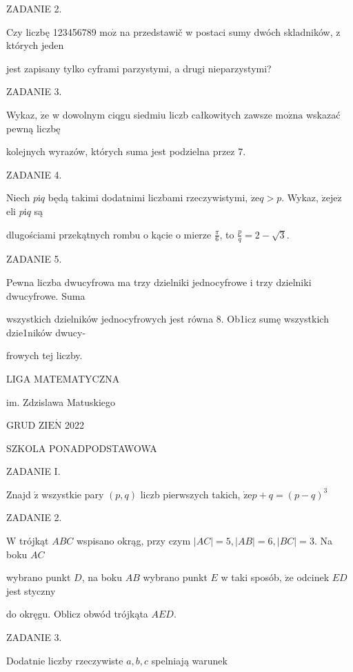 \documentclass[a4paper,12pt]{article}
\begin{document}
ZADANIE 2.

Czy liczbę 123456789 $\mathrm{m}\mathrm{o}\dot{\mathrm{z}}$ na przedstawič w postaci sumy dwóch skladników, z których jeden

jest zapisany tylko cyframi parzystymi, a drugi nieparzystymi?

ZADANIE 3.

Wykaz, $\dot{\mathrm{z}}\mathrm{e}$ w dowolnym ciqgu siedmiu liczb całkowitych zawsze $\mathrm{m}\mathrm{o}\acute{\mathrm{z}}\mathrm{n}\mathrm{a}$ wskazać pewną liczbę

kolejnych wyrazów, których suma jest podzielna przez 7.

ZADANIE 4.

Niech $p\mathrm{i}q$ będą takimi dodatnimi liczbami rzeczywistymi, $\dot{\mathrm{z}}\mathrm{e}q>p$. Wykaz, $\dot{\mathrm{z}}\mathrm{e}\mathrm{j}\mathrm{e}\dot{\mathrm{z}}$ eli $p\mathrm{i}q$ są

dlugościami przekątnych rombu o kącie o mierze $\displaystyle \frac{\pi}{6}$, to $\displaystyle \frac{p}{q}=2-\sqrt{3}.$

ZADANIE 5.

Pewna liczba dwucyfrowa ma trzy dzielniki jednocyfrowe i trzy dzielniki dwucyfrowe. Suma

wszystkich dzielników jednocyfrowych jest równa 8. Ob1icz sumę wszystkich dzie1ników dwucy-

frowych tej liczby.






LIGA MATEMATYCZNA

im. Zdzislawa Matuskiego

GRUD Z$\mathrm{I}\mathrm{E}\acute{\mathrm{N}}$ 2022

SZKOLA PONADPODSTAWOWA

ZADANIE I.

Znajd $\acute{\mathrm{z}}$ wszystkie pary $(p,q)$ liczb pierwszych takich, $\dot{\mathrm{z}}\mathrm{e}p+q=(p-q)^{3}$

ZADANIE 2.

$\mathrm{W}$ trójkąt $ABC$ wspisano okrąg, przy czym $|AC| = 5, |AB| = 6, |BC| = 3$. Na boku $AC$

wybrano punkt $D$, na boku $AB$ wybrano punkt $E$ w taki sposób, $\dot{\mathrm{z}}\mathrm{e}$ odcinek $ED$ jest styczny

do okręgu. Oblicz obwód trójkąta $AED.$

ZADANIE 3.

Dodatnie liczby rzeczywiste $a, b, c$ spelniają warunek
\end{document}
